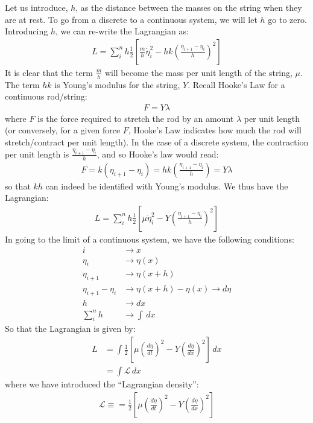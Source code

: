 Let us introduce, $h$, as the distance between the masses on the string when they are at rest. To go from a discrete to a continuous system, we will let $h$ go to zero. Introducing $h$, we can re-write the Lagrangian as:
\begin{align}
L=\sum_i^n h\frac{1}{2}\left[\frac{m}{h}\dot\eta_i^2-hk\left(\frac{\eta_{i+1}-\eta_i}{h}\right)^2\right]
\end{align}
It is clear that the term $\frac{m}{h}$ will become the mass per unit length of the string, $\mu$. The term $hk$ is Young's modulus for the string, $Y$. Recall Hooke's Law for a continuous rod/string:
\begin{align}
F=Y\lambda
\end{align}
where $F$ is the force required to stretch the rod by an amount $\lambda$ per unit length (or conversely, for a given force $F$, Hooke's Law indicates how much the rod will stretch/contract per unit length). In the case of a discrete system, the contraction per unit length is $\frac{\eta_{i+1}-\eta_i}{h}$, and so Hooke's law would read:
\begin{align}
F=k(\eta_{i+1}-\eta_i)=hk\left(\frac{\eta_{i+1}-\eta_i}{h}\right)=Y\lambda
\end{align}
so that $kh$ can indeed be identified with Young's modulus. We thus have the Lagrangian:
\begin{align}
L=\sum_i^n h\frac{1}{2}\left[\mu\dot\eta_i^2-Y\left(\frac{\eta_{i+1}-\eta_i}{h}\right)^2\right]
\end{align}
In going to the limit of a continuous system, we have the following conditions:
\begin{align}
i&\to x \nonumber\\
\eta_i &\to \eta(x)\nonumber\\
\eta_{i+1} &\to \eta(x+h)\nonumber\\
\eta_{i+1}-\eta_i &\to \eta(x+h)-\eta(x) \to d\eta\nonumber\\
h&\to dx \nonumber\\
\sum_i^n h &\to \int \,dx
\end{align}
So that the Lagrangian is given by:
\begin{align}
L&=\int \frac{1}{2}\left[\mu\left(\frac{d\eta}{dt}\right)^2-Y\left(\frac{d\eta}{dx}\right)^2\right]\,dx\nonumber\\
&=\int \mathcal{L} \,dx
\end{align}
where we have introduced the ``Lagrangian density'':
\begin{align}
\mathcal{L}\equiv=\frac{1}{2}\left[\mu\left(\frac{d\eta}{dt}\right)^2-Y\left(\frac{d\eta}{dx}\right)^2\right]
\end{align}
